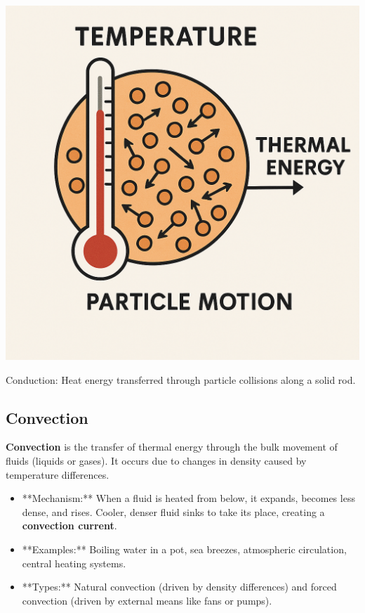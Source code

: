 \begin{marginfigure}[0pt]
\includegraphics[width=\linewidth]{thermal_energy.png} %
\caption{Conduction: Heat energy transferred through particle collisions along a solid rod.}
\label{fig:conduction}
\end{marginfigure}

\subsection{Convection}
\FloatBarrier

\textbf{Convection} is the transfer of thermal energy through the bulk movement of fluids (liquids or gases). It occurs due to changes in density caused by temperature differences.
\begin{itemize}
    \item **Mechanism:** When a fluid is heated from below, it expands, becomes less dense, and rises. Cooler, denser fluid sinks to take its place, creating a \textbf{convection current}.
    \item **Examples:** Boiling water in a pot, sea breezes, atmospheric circulation, central heating systems.
    \item **Types:** Natural convection (driven by density differences) and forced convection (driven by external means like fans or pumps).
\end{itemize}

